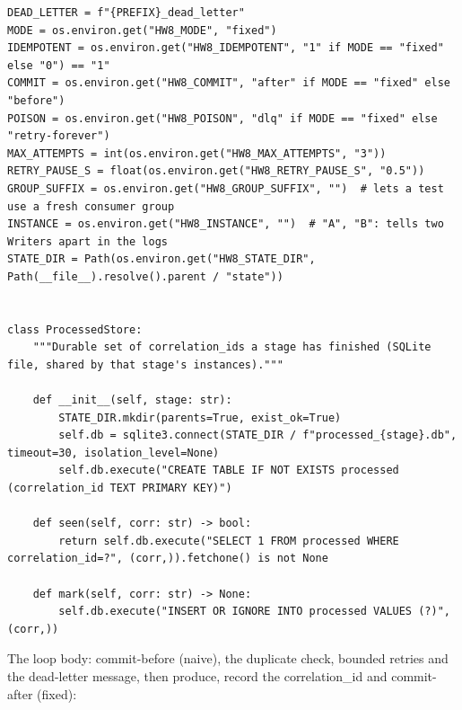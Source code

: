 \documentclass[11pt]{article}
\begin{document}
\begingroup\lstset{basicstyle=\ttfamily\tiny}
\begin{lstlisting}
DEAD_LETTER = f"{PREFIX}_dead_letter"
MODE = os.environ.get("HW8_MODE", "fixed")
IDEMPOTENT = os.environ.get("HW8_IDEMPOTENT", "1" if MODE == "fixed" else "0") == "1"
COMMIT = os.environ.get("HW8_COMMIT", "after" if MODE == "fixed" else "before")
POISON = os.environ.get("HW8_POISON", "dlq" if MODE == "fixed" else "retry-forever")
MAX_ATTEMPTS = int(os.environ.get("HW8_MAX_ATTEMPTS", "3"))
RETRY_PAUSE_S = float(os.environ.get("HW8_RETRY_PAUSE_S", "0.5"))
GROUP_SUFFIX = os.environ.get("HW8_GROUP_SUFFIX", "")  # lets a test use a fresh consumer group
INSTANCE = os.environ.get("HW8_INSTANCE", "")  # "A", "B": tells two Writers apart in the logs
STATE_DIR = Path(os.environ.get("HW8_STATE_DIR", Path(__file__).resolve().parent / "state"))


class ProcessedStore:
    """Durable set of correlation_ids a stage has finished (SQLite file, shared by that stage's instances)."""

    def __init__(self, stage: str):
        STATE_DIR.mkdir(parents=True, exist_ok=True)
        self.db = sqlite3.connect(STATE_DIR / f"processed_{stage}.db", timeout=30, isolation_level=None)
        self.db.execute("CREATE TABLE IF NOT EXISTS processed (correlation_id TEXT PRIMARY KEY)")

    def seen(self, corr: str) -> bool:
        return self.db.execute("SELECT 1 FROM processed WHERE correlation_id=?", (corr,)).fetchone() is not None

    def mark(self, corr: str) -> None:
        self.db.execute("INSERT OR IGNORE INTO processed VALUES (?)", (corr,))
\end{lstlisting}
\endgroup
The loop body: commit-before (naive), the duplicate check, bounded retries and the dead-letter message, then produce, record the correlation\_id and commit-after (fixed):
\end{document}
